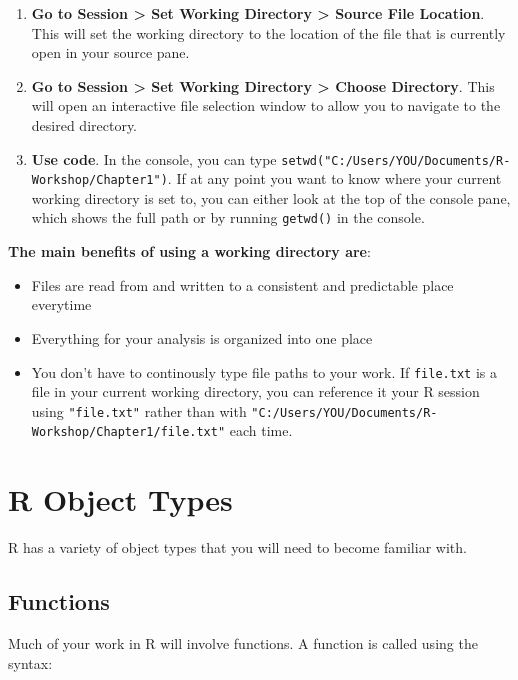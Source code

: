 \documentclass[]{book}
\providecommand{\tightlist}{%
  \setlength{\itemsep}{0pt}\setlength{\parskip}{0pt}}
\theoremstyle{definition}
\theoremstyle{definition}
\theoremstyle{definition}
\theoremstyle{remark}
\begin{document}
\begin{enumerate}
\def\labelenumi{\arabic{enumi}.}
\item
  \textbf{Go to Session \textgreater{} Set Working Directory
  \textgreater{} Source File Location}. This will set the working
  directory to the location of the file that is currently open in your
  source pane.
\item
  \textbf{Go to Session \textgreater{} Set Working Directory
  \textgreater{} Choose Directory}. This will open an interactive file
  selection window to allow you to navigate to the desired directory.
\item
  \textbf{Use code}. In the console, you can type
  \texttt{setwd("C:/Users/YOU/Documents/R-Workshop/Chapter1")}. If at
  any point you want to know where your current working directory is set
  to, you can either look at the top of the console pane, which shows
  the full path or by running \texttt{getwd()} in the console.
\end{enumerate}

\textbf{The main benefits of using a working directory are}:

\begin{itemize}
\tightlist
\item
  Files are read from and written to a consistent and predictable place
  everytime
\item
  Everything for your analysis is organized into one place
\item
  You don't have to continously type file paths to your work. If
  \texttt{file.txt} is a file in your current working directory, you can
  reference it your R session using \texttt{"file.txt"} rather than with
  \texttt{"C:/Users/YOU/Documents/R-Workshop/Chapter1/file.txt"} each
  time.
\end{itemize}

\section{R Object Types}\label{r-object-types}

R has a variety of object types that you will need to become familiar
with.

\subsection{Functions}\label{functions}

Much of your work in R will involve functions. A function is called
using the syntax:
\end{document}
